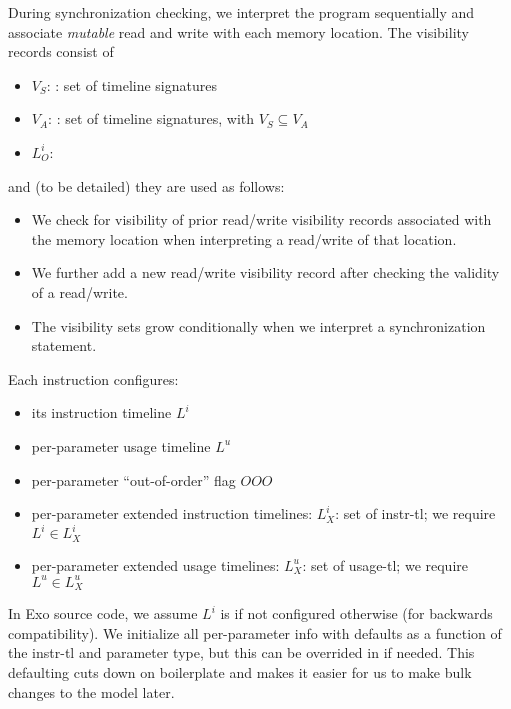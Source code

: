 During synchronization checking, we interpret the program sequentially and associate \textit{mutable} read and write  with each memory location.
The visibility records consist of
\begin{itemize}
  \item $V_S$: : set of timeline signatures
  \filbreak
  \item $V_A$: : set of timeline signatures, with $V_S \subseteq V_A$
  \filbreak
  \item $L_O^i$: 
\end{itemize}
\filbreak
and (to be detailed) they are used as follows:
\begin{itemize}
  \item We check for visibility of prior read/write visibility records associated with the memory location when interpreting a read/write of that location.
  \filbreak
  \item We further add a new read/write visibility record after checking the validity of a read/write.
  \filbreak
  \item The visibility sets grow conditionally when we interpret a synchronization statement.
\end{itemize}

\filbreak
{}

Each instruction configures:
\begin{itemize}
  \item its instruction timeline $L^i$
  \filbreak
  \item per-parameter usage timeline $L^u$
  \filbreak
  \item per-parameter ``out-of-order'' flag $OOO$
  \filbreak
  \item per-parameter extended instruction timelines: $L_X^i$: set of instr-tl; we require $L^i \in L_X^i$
  \filbreak
  \item per-parameter extended usage timelines: $L_X^u$: set of usage-tl; we require $L^u \in L_X^u$
\end{itemize}
In Exo source code, we assume $L^i$ is  if not configured otherwise (for backwards compatibility).
We initialize all per-parameter info with defaults as a function of the instr-tl and parameter  type, but this can be overrided in  if needed.
This defaulting cuts down on boilerplate and makes it easier for us to make bulk changes to the model later.

